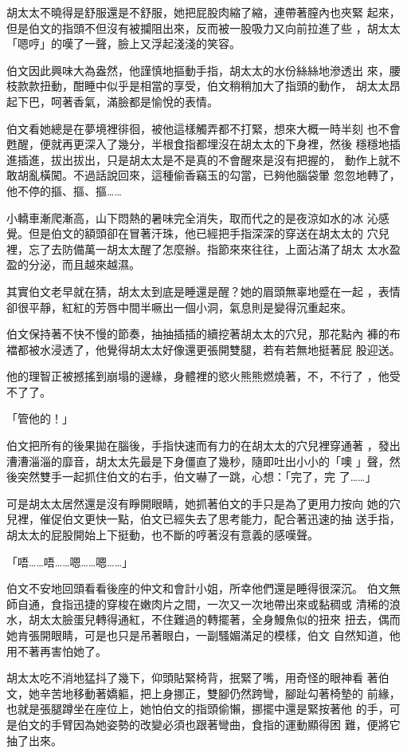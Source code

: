 胡太太不曉得是舒服還是不舒服，她把屁股肉縮了縮，連帶著膣內也夾緊
起來，但是伯文的指頭不但沒有被攔阻出來，反而被一股吸力又向前拉進了些
，胡太太「嗯哼」的嘆了一聲，臉上又浮起淺淺的笑容。

伯文因此興味大為盎然，他謹慎地摳動手指，胡太太的水份絲絲地滲透出
來，腰枝款款扭動，酣睡中似乎是相當的享受，伯文稍稍加大了指頭的動作，
胡太太昂起下巴，呵著香氣，滿臉都是愉悅的表情。

伯文看她總是在夢境裡徘徊，被他這樣觸弄都不打緊，想來大概一時半刻
也不會甦醒，便就再更深入了幾分，半根食指都埋沒在胡太太的下身裡，然後
穩穩地插進插進，拔出拔出，只是胡太太是不是真的不會醒來是沒有把握的，
動作上就不敢胡亂橫闖。不過話說回來，這種偷香竊玉的勾當，已夠他腦袋暈
忽忽地轉了，他不停的摳、摳、摳……

小轎車漸爬漸高，山下悶熱的暑味完全消失，取而代之的是夜涼如水的冰
沁感覺。但是伯文的額頭卻在冒著汗珠，他已經把手指深深的穿送在胡太太的
穴兒裡，忘了去防備萬一胡太太醒了怎麼辦。指節來來往往，上面沾滿了胡太
太水盈盈的分泌，而且越來越濕。

其實伯文老早就在猜，胡太太到底是睡還是醒？她的眉頭無辜地蹙在一起
，表情卻很平靜，紅紅的芳唇中間半噘出一個小洞，氣息則是變得沉重起來。

伯文保持著不快不慢的節奏，抽抽插插的續挖著胡太太的穴兒，那花點內
褲的布襠都被水浸透了，他覺得胡太太好像還更張開雙腿，若有若無地挺著屁
股迎送。

他的理智正被撼搖到崩塌的邊緣，身體裡的慾火熊熊燃燒著，不，不行了
，他受不了了。

「管他的！」

伯文把所有的後果拋在腦後，手指快速而有力的在胡太太的穴兒裡穿通著
，發出漕漕淄淄的靡音，胡太太先最是下身僵直了幾秒，隨即吐出小小的「噢
」聲，然後突然雙手一起抓住伯文的右手，伯文嚇了一跳，心想：「完了，完
了……」

可是胡太太居然還是沒有睜開眼睛，她抓著伯文的手只是為了更用力按向
她的穴兒裡，催促伯文更快一點，伯文已經失去了思考能力，配合著迅速的抽
送手指，胡太太的屁股開始上下挺動，也不斷的哼著沒有意義的感嘆聲。

「唔……唔……嗯……嗯……」

伯文不安地回頭看看後座的仲文和會計小姐，所幸他們還是睡得很深沉。
伯文無師自通，食指迅捷的穿梭在嫩肉片之間，一次又一次地帶出來或黏稠或
清稀的浪水，胡太太臉蛋兒轉得通紅，不住難過的轉擺著，全身鰻魚似的扭來
扭去，偶而她肯張開眼睛，可是也只是吊著眼白，一副騷媚滿足的模樣，伯文
自然知道，他用不著再害怕她了。

胡太太吃不消地猛抖了幾下，仰頭貼緊椅背，抿緊了嘴，用奇怪的眼神看
著伯文，她辛苦地移動著嬌軀，把上身挪正，雙腳仍然跨彎，腳趾勾著椅墊的
前緣，也就是張腿蹲坐在座位上，她怕伯文的指頭偷懶，挪擺中還是緊按著他
的手，可是伯文的手臂因為她姿勢的改變必須也跟著彎曲，食指的運動顯得困
難，便將它抽了出來。

